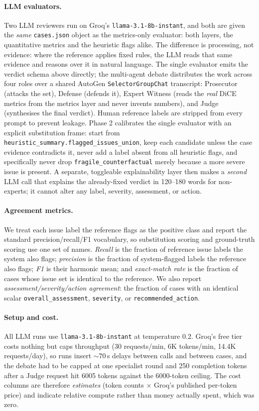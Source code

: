 \documentclass[letterpaper]{article}
\begin{document}
\paragraph{LLM evaluators.}
Two LLM reviewers run on Groq's \texttt{llama-3.1-8b-instant}, and both are given the \emph{same} \texttt{cases.json} object as the metrics-only evaluator: both layers, the quantitative metrics and the heuristic flags alike. The difference is processing, not evidence: where the reference applies fixed rules, the LLM reads that same evidence and reasons over it in natural language. The single evaluator emits the verdict schema above directly; the multi-agent debate distributes the work across four roles over a shared AutoGen \texttt{SelectorGroupChat} transcript: Prosecutor (attacks the set), Defense (defends it), Expert Witness (reads the \emph{real} DiCE metrics from the metrics layer and never invents numbers), and Judge (synthesises the final verdict). Human reference labels are stripped from every prompt to prevent leakage. Phase 2 calibrates the single evaluator with an explicit substitution frame: start from \texttt{heuristic\_summary.flagged\_issues\_union}, keep each candidate unless the case evidence contradicts it, never add a label absent from all heuristic flags, and specifically never drop \texttt{fragile\_counterfactual} merely because a more severe issue is present. A separate, toggleable explainability layer then makes a \emph{second} LLM call that explains the already-fixed verdict in 120--180 words for non-experts; it cannot alter any label, severity, assessment, or action. 

\paragraph{Agreement metrics.}
We treat each issue label the reference flags as the positive class and report the standard precision/recall/F1 vocabulary, so substitution scoring and ground-truth scoring use one set of names. \emph{Recall} is the fraction of reference issue labels the system also flags; \emph{precision} is the fraction of system-flagged labels the reference also flags; \emph{F1} is their harmonic mean; and \emph{exact-match rate} is the fraction of cases whose issue set is identical to the reference. We also report \emph{assessment/severity/action agreement}: the fraction of cases with an identical scalar \texttt{overall\_assessment}, \texttt{severity}, or \texttt{recommended\_action}.

\paragraph{Setup and cost.}
All LLM runs use \texttt{llama-3.1-8b-instant} at temperature 0.2. Groq's free tier costs nothing but caps throughput (30 requests/min, 6K tokens/min, 14.4K requests/day), so runs insert ${\sim}70$\,s delays between calls and between cases, and the debate had to be capped at one specialist round and 250 completion tokens after a Judge request hit 6005 tokens against the 6000-token ceiling. The cost columns are therefore \emph{estimates} (token counts $\times$ Groq's published per-token price) and indicate relative compute rather than money actually spent, which was zero.
\end{document}
